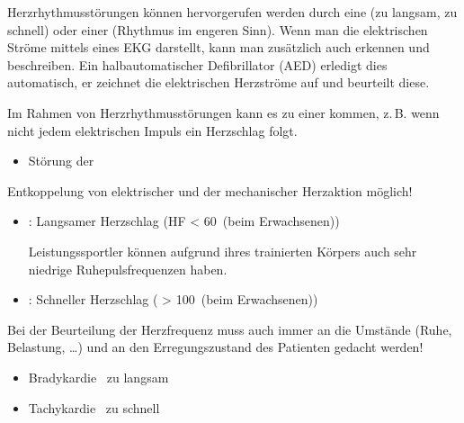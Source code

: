 {%
Herzrhythmusstörungen können hervorgerufen werden durch eine
 (zu langsam, zu schnell) oder
einer  (Rhythmus im engeren Sinn). 
Wenn man die
elektrischen Ströme mittels eines EKG darstellt, kann man
zusätzlich auch  erkennen und beschreiben. Ein halbautomatischer
Defibrillator (AED) erledigt dies automatisch, er zeichnet
die elektrischen Herzströme auf und beurteilt diese.

Im Rahmen von Herzrhythmusstörungen kann es zu einer
 kommen, z.\,B. wenn nicht jedem elektrischen
Impuls ein Herzschlag folgt.
}{
\begin{itemize}
  \item Störung der
\end{itemize}

Entkoppelung von elektrischer und der mechanischer
Herzaktion möglich!
}{}{}{}


{%
%
\begin{itemize}
  \item {}:  Langsamer Herzschlag
  ({HF \textless} 60\,\nicefrac{}{\Min} {\tiny (beim Erwachsenen)})
  
  Leistungssportler können aufgrund ihres trainierten Körpers auch sehr
  niedrige Ruhepulsfrequenzen haben.
  \item {}:  Schneller
  Herzschlag
  ( {\textgreater} 100\,\nicefrac{}{\Min} {\tiny
  (beim Erwachsenen)})
\end{itemize}

Bei der Beurteilung der Herzfrequenz muss auch immer an die Umstände 
(Ruhe, Belastung, \ldots) und an den
Erregungszustand des Patienten gedacht werden!
}{
\begin{itemize}
  \item Bradykardie \dotfill\ zu langsam
  \item Tachykardie \dotfill\ zu schnell
\end{itemize}
}{}{}{}


